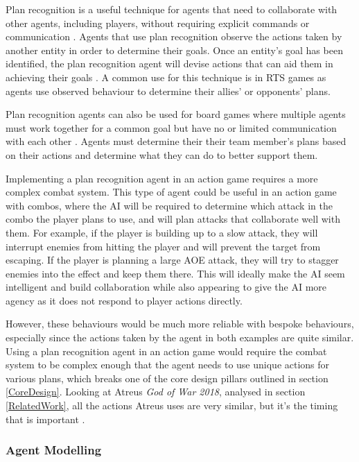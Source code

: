 \documentclass{IEEEtran}
\begin{document}
Plan recognition is a useful technique for agents that need to collaborate with other agents, including players, without requiring explicit commands or communication \cite{GeneratingCollabBehaviourPlanRecognition2016, PandemicPlanRecognition2021}. Agents that use plan recognition observe the actions taken by another entity in order to determine their goals. Once an entity’s goal has been identified, the plan recognition agent will devise actions that can aid them in achieving their goals \cite{GeneratingCollabBehaviourPlanRecognition2016}. A common use for this technique is in RTS games \cite{PlayerAdaptiveRTSAI2007} as agents use observed behaviour to determine their allies' or opponents' plans.

Plan recognition agents can also be used for board games where multiple agents must work together for a common goal but have no or limited communication with each other \cite{PandemicPlanRecognition2021}. Agents must determine their their team member's plans based on their actions and determine what they can do to better support them.

Implementing a plan recognition agent in an action game requires a more complex combat system. This type of agent could be useful in an action game with combos, where the AI will be required to determine which attack in the combo the player plans to use, and will plan attacks that collaborate well with them. For example, if the player is building up to a slow attack, they will interrupt enemies from hitting the player and will prevent the target from escaping. If the player is planning a large AOE attack, they will try to stagger enemies into the effect and keep them there. This will ideally make the AI seem intelligent and build collaboration while also appearing to give the AI more agency as it does not respond to player actions directly.

However, these behaviours would be much more reliable with bespoke behaviours, especially since the actions taken by the agent in both examples are quite similar. Using a plan recognition agent in an action game would require the combat system to be complex enough that the agent needs to use unique actions for various plans, which breaks one of the core design pillars outlined in section \ref{CoreDesign}. Looking at Atreus \textit{God of War 2018}, analysed in section \ref{RelatedWork}, all the actions Atreus uses are very similar, but it’s the timing that is important \cite{GDCAtreus}.

\subsubsection{Agent Modelling}
\label{AgentModelling}
\end{document}
